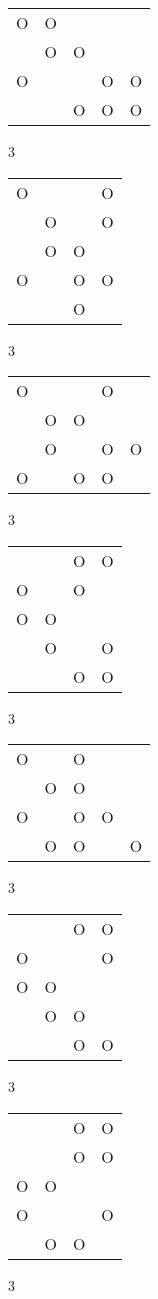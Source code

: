 \begin{tabular}{|m{0.2cm}m{0.2cm}m{0.2cm}m{0.2cm}m{0.2cm}|}\hline
O&O& & & \\
 &O&O& & \\
O& & &O&O\\
 & &O&O&O\\
\hline\end{tabular}3
\begin{tabular}{|m{0.2cm}m{0.2cm}m{0.2cm}m{0.2cm}|}\hline
O& & &O\\
 &O& &O\\
 &O&O& \\
O& &O&O\\
 & &O& \\
\hline\end{tabular}3
\begin{tabular}{|m{0.2cm}m{0.2cm}m{0.2cm}m{0.2cm}m{0.2cm}|}\hline
O& & &O& \\
 &O&O& & \\
 &O& &O&O\\
O& &O&O& \\
\hline\end{tabular}3
\begin{tabular}{|m{0.2cm}m{0.2cm}m{0.2cm}m{0.2cm}|}\hline
 & &O&O\\
O& &O& \\
O&O& & \\
 &O& &O\\
 & &O&O\\
\hline\end{tabular}3
\begin{tabular}{|m{0.2cm}m{0.2cm}m{0.2cm}m{0.2cm}m{0.2cm}|}\hline
O& &O& & \\
 &O&O& & \\
O& &O&O& \\
 &O&O& &O\\
\hline\end{tabular}3
\begin{tabular}{|m{0.2cm}m{0.2cm}m{0.2cm}m{0.2cm}|}\hline
 & &O&O\\
O& & &O\\
O&O& & \\
 &O&O& \\
 & &O&O\\
\hline\end{tabular}3
\begin{tabular}{|m{0.2cm}m{0.2cm}m{0.2cm}m{0.2cm}|}\hline
 & &O&O\\
 & &O&O\\
O&O& & \\
O& & &O\\
 &O&O& \\
\hline\end{tabular}3

